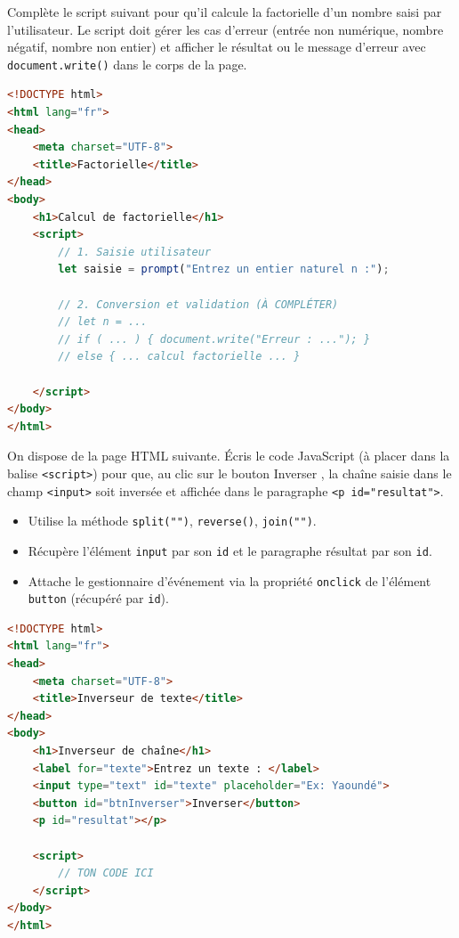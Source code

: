 \documentclass[11pt]{article}
\begin{document}
\begin{exercice}
Complète le script suivant pour qu'il calcule la factorielle d'un nombre saisi par l'utilisateur. Le script doit gérer les cas d'erreur (entrée non numérique, nombre négatif, nombre non entier) et afficher le résultat ou le message d'erreur avec \texttt{document.write()} dans le corps de la page.
\begin{lstlisting}[language=html]
<!DOCTYPE html>
<html lang="fr">
<head>
    <meta charset="UTF-8">
    <title>Factorielle</title>
</head>
<body>
    <h1>Calcul de factorielle</h1>
    <script>
        // 1. Saisie utilisateur
        let saisie = prompt("Entrez un entier naturel n :");
        
        // 2. Conversion et validation (À COMPLÉTER)
        // let n = ... 
        // if ( ... ) { document.write("Erreur : ..."); }
        // else { ... calcul factorielle ... }
        
    </script>
</body>
</html>
\end{lstlisting}
\end{exercice}

\begin{exercice}
On dispose de la page HTML suivante. Écris le code JavaScript (à placer dans la balise \texttt{<script>}) pour que, au clic sur le bouton \guillemotleft Inverser \guillemotright, la chaîne saisie dans le champ \texttt{<input>} soit inversée et affichée dans le paragraphe \texttt{<p id="resultat">}.
\begin{itemize}
    \item Utilise la méthode \texttt{split("")}, \texttt{reverse()}, \texttt{join("")}.
    \item Récupère l'élément \texttt{input} par son \texttt{id} et le paragraphe résultat par son \texttt{id}.
    \item Attache le gestionnaire d'événement via la propriété \texttt{onclick} de l'élément \texttt{button} (récupéré par \texttt{id}).
\end{itemize}
\begin{lstlisting}[language=html]
<!DOCTYPE html>
<html lang="fr">
<head>
    <meta charset="UTF-8">
    <title>Inverseur de texte</title>
</head>
<body>
    <h1>Inverseur de chaîne</h1>
    <label for="texte">Entrez un texte : </label>
    <input type="text" id="texte" placeholder="Ex: Yaoundé">
    <button id="btnInverser">Inverser</button>
    <p id="resultat"></p>

    <script>
        // TON CODE ICI
    </script>
</body>
</html>
\end{lstlisting}
\end{exercice}
\end{document}
